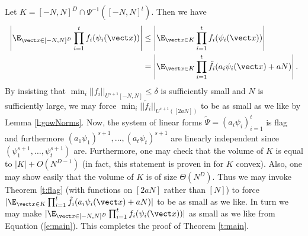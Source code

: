 Let $K = [-N,N]^D \cap \Psi^{-1}([-N,N]^t)$. Then we have 
\begin{align}\label{e:main}
\left|\E_{\vect x \in [-N,N]^D} \prod_{i=1}^t f_i(\psi_i(\vect x))\right| &\leq  \left|\E_{\vect x \in K}\prod_{i=1}^t f_i(\psi_i(\vect x))\right| \nonumber  \\
&=  \left|\E_{\vect x \in K}\prod_{i=1}^t \tilde f_i(a_i\psi_i(\vect x) + aN)\right|.
\end{align}
By insisting that $\min_i||f_i||_{U^{s+1}[-N,N]}\leq \delta $ is sufficiently small and $N$ is sufficiently large, we may force $\min_i||\tilde f_i||_{U^{s+1}([2aN])}$ to be as small as we like by Lemma \ref{l:gowNorms}. Now, the system of linear forms $\tilde \Psi = (a_i\psi_i)_{i=1}^t$ is flag and furthermore $(a_1\psi_1)^{s+1}, \ldots, (a_t\psi_t)^{s+1}$ are linearly independent since $(\psi_1^{s+1}, \ldots, \psi_t^{s+1})$ are. Furthermore, one may check that the volume of $K$ is equal to $|K| + O(N^{D-1})$ (in fact, this statement is proven in \cite[Appendix A]{GT10L} for $K$ convex). Also, one may show easily that the volume of $K$ is of size  $\Theta(N^D)$. Thus we may invoke Theorem \ref{t:flag} (with functions on $[2aN]$ rather than $[N]$) to force $|\E_{\vect x \in K}\prod_{i=1}^t \tilde f_i(a_i\psi_i(\vect x) + aN)|$ to be as small as we like. In turn we may make $|\E_{\vect x \in [-N,N]^D} \prod_{i=1}^t f_i(\psi_i(\vect x))|$ as small as we like from Equation (\ref{e:main}). This completes the proof of Theorem \ref{t:main}.

